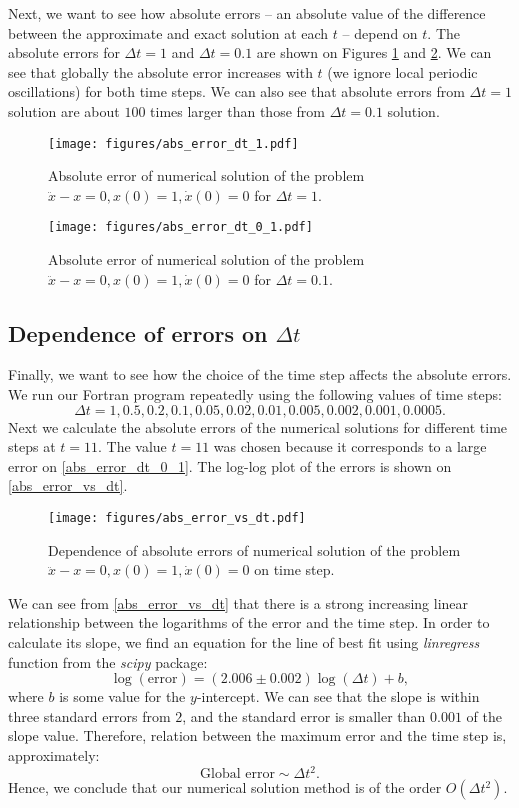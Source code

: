 Next, we want to see how absolute errors -- an absolute value of the difference between the approximate and exact solution at each $t$ -- depend on $t$. The absolute errors for $\Delta t = 1$ and $\Delta t = 0.1$ are shown on Figures \ref{abs_error_dt_1} and \ref{abs_error_dt_0_1}. We can see that globally the absolute error increases with $t$ (we ignore local periodic oscillations) for both time steps. We can also see that absolute errors from $\Delta t = 1$ solution are about $100$ times larger than those from $\Delta t = 0.1$ solution.

\begin{figure}[H]
  \centering
  \texttt{[image: figures/abs\_error\_dt\_1.pdf]}
  \caption{Absolute error of numerical solution of the problem $\ddot{x} - x = 0, x(0)=1, \dot{x}(0)=0$ for $\Delta t = 1$.}
  \label{abs_error_dt_1}
\end{figure}
\begin{figure}[H]
  \centering
  \texttt{[image: figures/abs\_error\_dt\_0\_1.pdf]}
  \caption{Absolute error of numerical solution of the problem $\ddot{x} - x = 0, x(0)=1, \dot{x}(0)=0$ for $\Delta t = 0.1$.}
  \label{abs_error_dt_0_1}
\end{figure}


\subsection{Dependence of errors on $\Delta t$}

Finally, we want to see how the choice of the time step affects the absolute errors. We run our Fortran program repeatedly using the following values of time steps:
\[
  \Delta t = 1, 0.5, 0.2, 0.1, 0.05, 0.02, 0.01, 0.005, 0.002, 0.001, 0.0005.
\]
Next we calculate the absolute errors of the numerical solutions for different time steps at $t=11$. The value $t=11$ was chosen because it corresponds to a large error on \autoref{abs_error_dt_0_1}. The log-log plot of the errors is shown on \autoref{abs_error_vs_dt}.

\begin{figure}[H]
  \centering
  \texttt{[image: figures/abs\_error\_vs\_dt.pdf]}
  \caption{Dependence of absolute errors of numerical solution of the problem $\ddot{x} - x = 0, x(0)=1, \dot{x}(0)=0$ on time step.}
  \label{abs_error_vs_dt}
\end{figure}

We can see from \autoref{abs_error_vs_dt} that there is a strong increasing linear relationship between the logarithms of the error and the time step. In order to calculate its slope, we find an equation for the line of best fit using \emph{linregress} function from the \emph{scipy} package:
\[
  \log(\textrm{error}) = (2.006 \pm 0.002) \log(\Delta t) + b,
\]
where $b$ is some value for the $y$-intercept. We can see that the slope is within three standard errors from $2$, and the standard error is smaller than $0.001$ of the slope value. Therefore, relation between the maximum error and the time step is, approximately:
\[
  \textrm{Global error} \sim \Delta t^2.
\]
Hence, we conclude that our numerical solution method is of the order $O(\Delta t^2)$.


